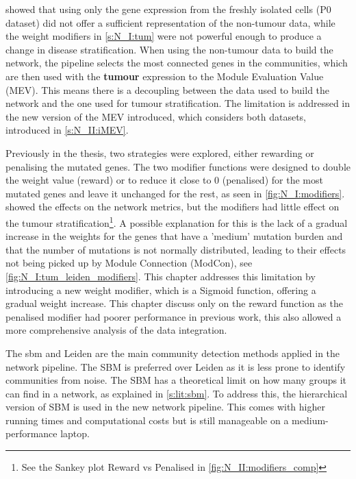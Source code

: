  showed that using only the gene expression from the freshly isolated cells (P0 dataset) did not offer a sufficient representation of the non-tumour data, while the weight modifiers in \cref{s:N_I:tum} were not powerful enough to produce a change in disease stratification. When using the non-tumour data to build the network, the pipeline selects the most connected genes in the communities, which are then used with the \textbf{tumour} expression to the Module Evaluation Value (MEV). This means there is a decoupling between the data used to build the network and the one used for tumour stratification. The limitation is addressed in the new version of the MEV introduced, which considers both datasets, introduced in \cref{s:N_II:iMEV}.


Previously in the thesis, two strategies were explored, either rewarding or penalising the mutated genes. The two modifier functions were designed to double the weight value (reward) or to reduce it close to 0 (penalised) for the most mutated genes and leave it unchanged for the rest, as seen in \cref{fig:N_I:modifiers}.  showed the effects on the network metrics, but the modifiers had little effect on the tumour stratification\footnote{See the Sankey plot Reward vs Penalised in \cref{fig:N_II:modifiers_comp}}. A possible explanation for this is the lack of a gradual increase in the weights for the genes that have a 'medium' mutation burden and that the number of mutations is not normally distributed, leading to their effects not being picked up by Module Connection (ModCon), see \cref{fig:N_I:tum_leiden_modifiers}. This chapter addresses this limitation by introducing a new weight modifier, which is a Sigmoid function, offering a gradual weight increase. This chapter discuss only on the reward function as the penalised modifier had poorer performance in previous work, this also allowed a more comprehensive analysis of the data integration.


The \acrfull{sbm} and Leiden are the main community detection methods applied in the network pipeline. The SBM is preferred over Leiden as it is less prone to identify communities from noise. The SBM has a theoretical limit on how many groups it can find in a network, as explained in \cref{s:lit:sbm}. To address this, the hierarchical version of SBM is used in the new network pipeline. This comes with higher running times and computational costs but is still manageable on a medium-performance laptop.

